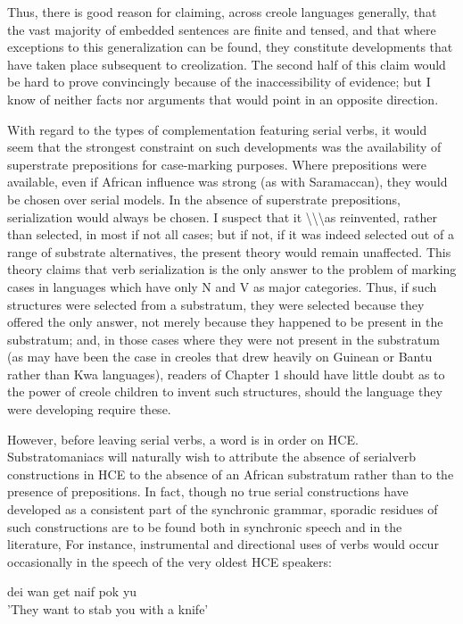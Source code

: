 Thus, there is good reason for claiming, across creole languages generally, that the vast majority of embedded sentences are finite and tensed, and that where exceptions to this generalization can be found, they constitute developments that have taken place subsequent to creolization. The second half of this claim would be hard to prove con\-vincingly because of the inaccessibility of evidence; but I know of neither facts nor arguments that would point in an opposite direction.

With regard to the types of complementation featuring serial verbs, it would seem that the strongest constraint on such develop\-ments was the availability of superstrate prepositions for case-marking purposes. Where prepositions were available, even if African influence was strong (as with Saramaccan), they would be chosen over serial models. In the absence of superstrate prepositions, serialization would always be chosen. I suspect that it {\textbackslash}{\textbackslash}{\textbackslash}as reinvented, rather than selected,
in most if not all cases; but if not, if it was indeed selected out of a range of substrate alternatives, the present theory would remain un\-affected. This theory claims that verb serialization is the only answer to the problem of marking cases in languages which have only N and V as major categories. Thus, if such structures were selected from a substratum, they were selected because they offered the only answer, not merely because they happened to be present in the substratum; and, in those cases where they were not present in the substratum (as may have been the case in creoles that drew heavily on Guinean or Bantu rather than Kwa languages), readers of Chapter 1 should have little doubt as to the power of creole children to invent such structures, should the language they were developing require these.

However, before leaving serial verbs, a word is in order on HCE. Substratomaniacs will naturally wish to attribute the absence of serial\-verb constructions in HCE to the absence of an African substratum rather than to the presence of prepositions. In fact, though no true serial constructions have developed as a consistent part of the syn\-chronic grammar, sporadic residues of such constructions are to be found both in synchronic speech and in the literature, For instance, instrumental and directional uses of verbs would occur occasionally in the speech of the very oldest HCE speakers:

\ea\label{ex:263}
 dei wan get naif pok yu\\
\glt'They want to stab you with a knife'
\z



